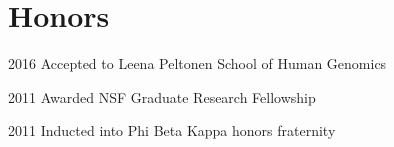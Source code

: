 \documentclass{article}
\begin{document}
\section*{Honors}
\begin{hdesc}
\item[2016] Accepted to Leena Peltonen School of Human Genomics
\item[2011] Awarded NSF Graduate Research Fellowship
\item[2011] Inducted into Phi Beta Kappa honors fraternity
\end{hdesc}
\end{document}
